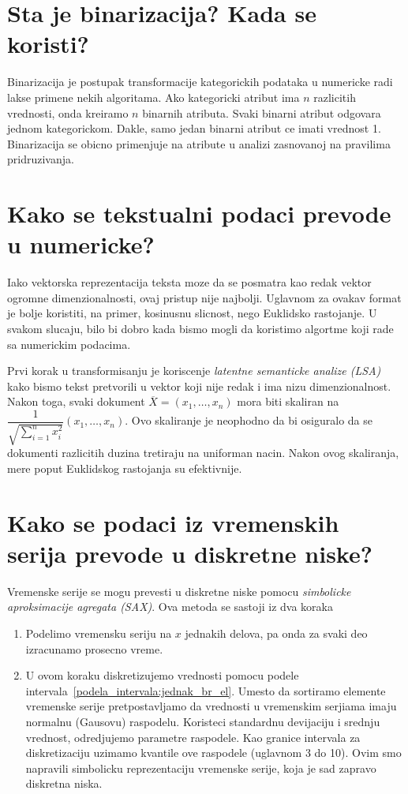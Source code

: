 \documentclass[a4paper]{article}
\begin{document}
\section{Sta je binarizacija? Kada se koristi?}
\emph{}Binarizacija je postupak transformacije kategorickih podataka u numericke radi lakse primene
nekih algoritama. Ako kategoricki atribut ima \(n\) razlicitih vrednosti, onda kreiramo \(n\)
binarnih atributa. Svaki binarni atribut odgovara jednom kategorickom. Dakle, samo jedan binarni
atribut ce imati vrednost 1. Binarizacija se obicno primenjuje na atribute u analizi zasnovanoj na
pravilima
pridruzivanja.

\section{Kako se tekstualni podaci prevode u numericke?}
Iako vektorska reprezentacija teksta moze da se posmatra kao redak vektor ogromne dimenzionalnosti,
ovaj pristup nije najbolji. Uglavnom za ovakav format je bolje koristiti, na primer, kosinusnu
slicnost, nego Euklidsko rastojanje. U svakom slucaju, bilo bi dobro kada bismo mogli da koristimo
algortme koji rade sa numerickim podacima.

Prvi korak u transformisanju je koriscenje \emph{latentne semanticke analize (LSA)} kako bismo tekst
pretvorili u vektor koji nije redak i ima nizu dimenzionalnost. Nakon toga, svaki dokument
\(\overline{X} = (x_1, \ldots, x_n)\) mora biti skaliran na
\(\dfrac{1}{\sqrt{\sum_{i=1}^{n}x_i^2}}(x_1, \ldots, x_n)\). Ovo skaliranje je neophodno da bi
osiguralo da se dokumenti razlicitih duzina tretiraju na uniforman nacin. Nakon ovog skaliranja,
mere poput Euklidskog rastojanja su efektivnije.

\section{Kako se podaci iz vremenskih serija prevode u diskretne niske?}
Vremenske serije se mogu prevesti u diskretne niske pomocu \emph{simbolicke aproksimacije agregata
(SAX)}. Ova metoda se sastoji iz dva koraka
\begin{enumerate}
    \item Podelimo vremensku seriju na \(x\) jednakih delova, pa onda za svaki deo izracunamo
        prosecno vreme.
    \item U ovom koraku diskretizujemo vrednosti pomocu podele
        intervala~\ref{podela_intervala:jednak_br_el}. Umesto da sortiramo elemente vremenske serije
        pretpostavljamo da vrednosti u vremenskim serjiama imaju normalnu (Gausovu) raspodelu.
        Koristeci standardnu devijaciju i srednju vrednost, odredjujemo parametre raspodele. Kao
        granice intervala za diskretizaciju uzimamo kvantile ove raspodele (uglavnom 3 do 10). Ovim
        smo napravili simbolicku reprezentaciju vremenske serije, koja je sad zapravo diskretna
        niska.
\end{enumerate}
\end{document}
